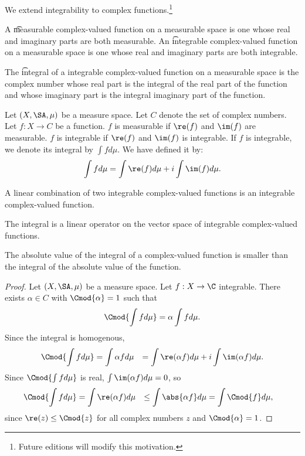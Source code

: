 

We extend integrability to complex functions.\footnote{Future editions will modify this motivation.}


A \t{measurable} complex-valued function on a measurable space is one whose real and imaginary parts are both measurable.
An \t{integrable} complex-valued function on a measurable space is one whose real and imaginary parts are both integrable.

The \t{integral} of a integrable complex-valued function on a measurable space is the complex number whose real part is the integral of the real part of the function and whose imaginary part is the integral imaginary part of the function.


Let $(X, \SA, \mu)$
be a measure space.
Let $C$ denote the set
of complex numbers.
Let $f: X \to C$
be a function.
$f$ is measurable
if $\re(f)$ and $\im(f)$
are measurable.
$f$ is integrable if
$\re(f)$ and $\im(f)$
is integrable.
If $f$ is integrable,
we denote its integral
by $\int f d\mu$.
We have defined it by:
\[
  \int f d\mu = \int \re(f)d\mu
  + i\int \im(f) d\mu.
\]


\begin{prop}
A linear combination
of two integrable complex-valued
functions is an integrable
complex-valued function.
\end{prop}

\begin{prop}
The integral is a linear
operator on the vector space
of integrable complex-valued
functions.
\end{prop}

\begin{prop}
The absolute value
of the integral of a
complex-valued function
is smaller than the integral
of the absolute value
of the function.

\begin{proof}
Let $(X, \SA, \mu)$ be a measure space.
Let $f: X \to \C$ integrable.
There exists $\alpha \in C$ with $\Cmod{\alpha} = 1$ such that
\[
  \Cmod{\int f d\mu} = \alpha \int f d\mu.
\]
Since the integral is homogenous,
\[
  \begin{aligned}
  \Cmod{\int f d\mu}
  &= \int \alpha f d\mu
  &= \int \re(\alpha f) d\mu + i \int \im(\alpha f)d\mu.
  \end{aligned}
\]
  Since $\Cmod{\int f d\mu}$ is real,
  $\int \im(\alpha f) d\mu = 0$,
  so
  \[
  \begin{aligned}
  \Cmod{\int f d\mu}
  &= \int \re(\alpha f) d\mu
  &\leq \int \abs{\alpha f} d\mu
  &= \int \Cmod{f} d\mu,
  \end{aligned}
  \]
  since $\re(z) \leq \Cmod{z}$ for all
  complex numbers $z$ and $\Cmod{\alpha} = 1$.
\end{proof}
\end{prop}
